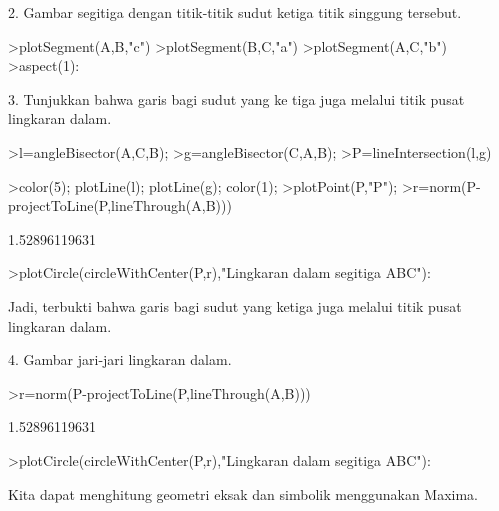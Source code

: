 \documentclass[a4paper,10pt]{article}
\begin{document}
\begin{eulernotebook}
\begin{eulercomment}
\begin{eulercomment}
\begin{eulercomment}
\begin{eulercomment}
\begin{eulercomment}
\begin{eulercomment}
\begin{eulercomment}
\begin{eulercomment}
\begin{eulercomment}
\begin{eulercomment}
\begin{eulercomment}
\begin{eulercomment}
\begin{eulercomment}
\begin{eulercomment}
\begin{eulercomment}
\begin{eulercomment}
\begin{eulercomment}
2. Gambar segitiga dengan titik-titik sudut ketiga titik singgung
tersebut.
\end{eulercomment}
\begin{eulerprompt}
>plotSegment(A,B,"c")
>plotSegment(B,C,"a")
>plotSegment(A,C,"b")
>aspect(1):
\end{eulerprompt}
\begin{eulercomment}
3. Tunjukkan bahwa garis bagi sudut yang ke tiga juga melalui titik
pusat lingkaran dalam.
\end{eulercomment}
\begin{eulerprompt}
>l=angleBisector(A,C,B);
>g=angleBisector(C,A,B);
>P=lineIntersection(l,g)
\end{eulerprompt}
\begin{euleroutput}
  [0.581139,  0.581139]
\end{euleroutput}
\begin{eulerprompt}
>color(5); plotLine(l); plotLine(g); color(1);
>plotPoint(P,"P");
>r=norm(P-projectToLine(P,lineThrough(A,B)))
\end{eulerprompt}
\begin{euleroutput}
  1.52896119631
\end{euleroutput}
\begin{eulerprompt}
>plotCircle(circleWithCenter(P,r),"Lingkaran dalam segitiga ABC"):
\end{eulerprompt}
\begin{eulercomment}
Jadi, terbukti bahwa garis bagi sudut yang ketiga juga melalui titik
pusat lingkaran dalam.

4. Gambar jari-jari lingkaran dalam.
\end{eulercomment}
\begin{eulerprompt}
>r=norm(P-projectToLine(P,lineThrough(A,B)))
\end{eulerprompt}
\begin{euleroutput}
  1.52896119631
\end{euleroutput}
\begin{eulerprompt}
>plotCircle(circleWithCenter(P,r),"Lingkaran dalam segitiga ABC"):
\end{eulerprompt}
\begin{eulercomment}
Kita dapat menghitung geometri eksak dan simbolik menggunakan Maxima.


\end{eulercomment}
\end{eulercomment}
\end{eulercomment}
\end{eulercomment}
\end{eulercomment}
\end{eulercomment}
\end{eulercomment}
\end{eulercomment}
\end{eulercomment}
\end{eulercomment}
\end{eulercomment}
\end{eulercomment}
\end{eulercomment}
\end{eulercomment}
\end{eulercomment}
\end{eulercomment}
\end{eulercomment}
\end{eulernotebook}
\end{document}
